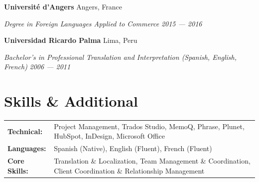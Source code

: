 \documentclass[11pt,letterpaper]{article}
\newcommand{\entry}[4]{%
  \noindent\textbf{#1} \hfill #2 \par\nopagebreak
  \textit{#3} \hfill \textit{#4} \par\nopagebreak
}
\begin{document}
\entry{Universit\'{e} d'Angers}{Angers, France}{Degree in Foreign Languages Applied to Commerce}{2015 --- 2016}
\vspace{0.3em}

\entry{Universidad Ricardo Palma}{Lima, Peru}{Bachelor's in Professional Translation and Interpretation (Spanish, English, French)}{2006 --- 2011}
\vspace{0.3em}

\section{Skills \& Additional}

\begin{tabularx}{\textwidth}{@{}l X@{}}
\textbf{Technical:} & Project Management, Trados Studio, MemoQ, Phrase, Plunet, HubSpot, InDesign, Microsoft Office \\
\textbf{Languages:} & Spanish (Native), English (Fluent), French (Fluent) \\
\textbf{Core Skills:} & Translation \& Localization, Team Management \& Coordination, Client Coordination \& Relationship Management \\
\end{tabularx}
\end{document}
